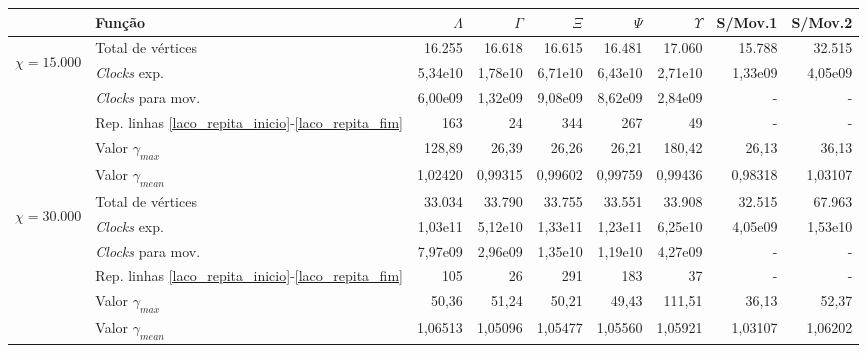 \begin{table}
\begin{center}
\begin{tabular}{|c|l|r|r|r|r|r|r|r|} %
\hline
& Função & $\Lambda$ & $\Gamma$ & $\Xi$ & $\Psi$ & $\Upsilon$ & S/Mov.1 & S/Mov.2 \\
\hline %
\multirow{5}{*}{\begin{sideways}$\chi = 15.000$\end{sideways} } 
& Total de vértices                                                     & 16.255 & 16.618 & 16.615 & 16.481 & 17.060 & 15.788 & 32.515 \\
& {\it Clocks} exp.	                                             	& 5,34e10 & 1,78e10 & 6,71e10 & 6,43e10 & 2,71e10 & 1,33e09 & 4,05e09 \\
& {\it Clocks} para mov.                                      		& 6,00e09 & 1,32e09 & 9,08e09 & 8,62e09 & 2,84e09 & - & - \\
& Rep. linhas \ref{laco_repita_inicio}-\ref{laco_repita_fim} 		& 163 & 24 & 344 & 267 & 49 & - & - \\
& Valor $\gamma_{max}$							& 128,89 & 26,39 & 26,26  & 26,21 & 180,42 & 26,13 & 36,13 \\
& Valor $\gamma_{mean}$							& 1,02420 & 0,99315 & 0,99602 & 0,99759 & 0,99436& 0,98318 & 1,03107 \\
\hline %
\multirow{5}{*}{\begin{sideways}$\chi = 30.000$\end{sideways} } 
& Total de vértices                                                     & 33.034 & 33.790 & 33.755 & 33.551 & 33.908 & 32.515 & 67.963 \\
& {\it Clocks} exp.	                                             	& 1,03e11 & 5,12e10 & 1,33e11 & 1,23e11 & 6,25e10 & 4,05e09 & 1,53e10 \\
& {\it Clocks} para mov.                                      		& 7,97e09 & 2,96e09 & 1,35e10 & 1,19e10 & 4,27e09 & - & - \\
& Rep. linhas \ref{laco_repita_inicio}-\ref{laco_repita_fim} 		& 105 & 26 & 291 & 183 & 37 & - & - \\
& Valor $\gamma_{max}$							& 50,36 & 51,24 & 50,21  & 49,43 & 111,51 & 36,13 & 52,37 \\
& Valor $\gamma_{mean}$							& 1,06513 & 1,05096 & 1,05477 & 1,05560 & 1,05921 & 1,03107 & 1,06202 \\

\end{tabular}
\end{center}
\end{table}
